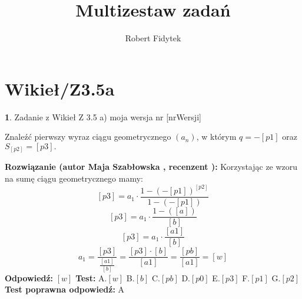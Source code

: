 \documentclass[12pt, a4paper]{article}
\title{Multizestaw zadań}
\author{Robert Fidytek}
\date{}
\theoremstyle{definition} %
\newtheorem{zad}{}
\newcommand{\kategoria}[1]{\section{#1}} %
\newcommand{\zadStart}[1]{\begin{zad}#1\newline} %
\newcommand{\zadStop}{\end{zad}}   %
\newcommand{\rozwStart}[2]{\noindent \textbf{Rozwiązanie (autor #1 , recenzent #2): }\newline} %
\newcommand{\rozwStop}{\newline}                                            %
\newcommand{\odpStart}{\noindent \textbf{Odpowiedź:}\newline}    %
\newcommand{\odpStop}{\newline}                                             %
\newcommand{\testStart}{\noindent \textbf{Test:}\newline} %
\newcommand{\testStop}{\newline} %
\newcommand{\kluczStart}{\noindent \textbf{Test poprawna odpowiedź:}\newline} %
\newcommand{\kluczStop}{\newline} %
\begin{document}
\maketitle


\kategoria{Wikieł/Z3.5a}
\zadStart{Zadanie z Wikieł Z 3.5 a)  moja wersja nr [nrWersji]}


Znaleźć pierwszy wyraz ciągu geometrycznego $(a_{n})$, w którym $q=-[p1]$ oraz $S_{[p2]}=[p3].$
\zadStop
\rozwStart{Maja Szabłowska}{}
Korzystając ze wzoru na sumę ciągu geometrycznego mamy:
$$ [p3]=a_{1}\cdot \frac{1-(-[p1])^{[p2]}}{1-(-[p1])}$$
$$ [p3]=a_{1}\cdot \frac{1-([a])}{[b]}$$
$$ [p3]=a_{1}\cdot \frac{[a1]}{[b]}$$
$$ a_{1}=\frac{[p3]}{\frac{[a1]}{[b]}}=\frac{[p3]\cdot[b]}{[a1]}=\frac{[pb]}{[a1]}=[w]$$
\rozwStop
\odpStart
$[w]$
\odpStop
\testStart
A.$[w]$
B.$[b]$
C.$[pb]$
D.$[p0]$
E.$[p3]$
F.$[p1]$
G.$[p2]$
\testStop
\kluczStart
A
\kluczStop
\end{document}
